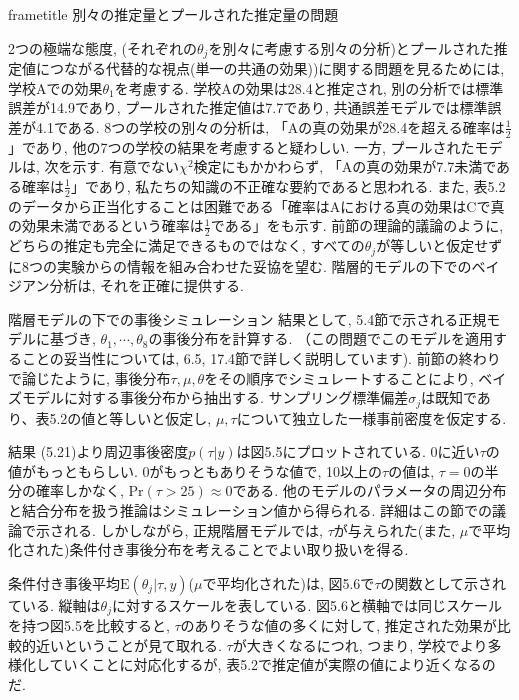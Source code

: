 \documentclass[10pt,dvipdfmx,a4]{beamer}
\newcommand{\cbox}[1]{\begin{beamercolorbox}[wd=122mm, sep=0pt, shadow=false, rounded=false]{frametitle} {\large #1}\end{beamercolorbox}}
\begin{document}

\begin{frame}
\cbox{別々の推定量とプールされた推定量の問題}
2つの極端な態度, (それぞれの$\theta_j$を別々に考慮する別々の分析)とプールされた推定値につながる代替的な視点(単一の共通の効果))に関する問題を見るためには, 学校Aでの効果$\theta_1$を考慮する.
学校Aの効果は28.4と推定され, 別の分析では標準誤差が14.9であり, プールされた推定値は7.7であり, 共通誤差モデルでは標準誤差が4.1である.
8つの学校の別々の分析は, 「Aの真の効果が28.4を超える確率は$\tfrac{1}{2}$」であり, 他の7つの学校の結果を考慮すると疑わしい.
一方, プールされたモデルは, 次を示す.
 有意でない$\chi^2$検定にもかかわらず, 「Aの真の効果が7.7未満である確率は$\tfrac{1}{2}$」であり, 私たちの知識の不正確な要約であると思われる.
また, 表5.2のデータから正当化することは困難である「確率はAにおける真の効果はCで真の効果未満であるという確率は$\tfrac{1}{2}$である」をも示す.
前節の理論的議論のように, どちらの推定も完全に満足できるものではなく, すべての$\theta_j$が等しいと仮定せずに8つの実験からの情報を組み合わせた妥協を望む.
階層的モデルの下でのベイジアン分析は, それを正確に提供する.
\end{frame}


\begin{frame}{階層モデルの下での事後シミュレーション}
結果として, 5.4節で示される正規モデルに基づき, $\theta_1, \cdots, \theta_8$の事後分布を計算する.
（この問題でこのモデルを適用することの妥当性については, 6.5, 17.4節で詳しく説明しています).
前節の終わりで論じたように, 事後分布$\tau, \mu, \theta$をその順序でシミュレートすることにより, ベイズモデルに対する事後分布から抽出する.
サンプリング標準偏差$\sigma_j$は既知であり、表5.2の値と等しいと仮定し, $\mu, \tau$について独立した一様事前密度を仮定する.
\end{frame}


\begin{frame}{結果}
(5.21)より周辺事後密度$p(\tau|y)$は図5.5にプロットされている.
0に近い$\tau$の値がもっともらしい.
0がもっともありそうな値で, 10以上の$\tau$の値は, $\tau=0$の半分の確率しかなく, $\text{Pr}(\tau>25)\approx 0$である.
他のモデルのパラメータの周辺分布と結合分布を扱う推論はシミュレーション値から得られる.
詳細はこの節での議論で示される.
しかしながら, 正規階層モデルでは, $\tau$が与えられた(また, $\mu$で平均化された)条件付き事後分布を考えることでよい取り扱いを得る.

条件付き事後平均$\text{E}(\theta_j|\tau,y)$($\mu$で平均化された)は, 図5.6で$\tau$の関数として示されている.
縦軸は$\theta_j$に対するスケールを表している.
図5.6と横軸では同じスケールを持つ図5.5を比較すると, $\tau$のありそうな値の多くに対して, 推定された効果が比較的近いということが見て取れる.
$\tau$が大きくなるにつれ, つまり, 学校でより多様化していくことに対応化するが, 表5.2で推定値が実際の値により近くなるのだ.
\end{frame}
\end{document}
